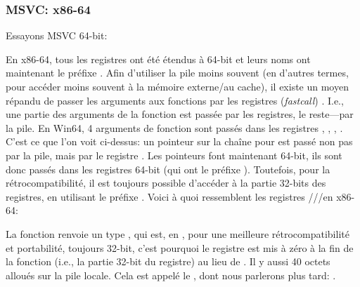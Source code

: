 \subsubsection{MSVC: x86-64}

Essayons MSVC 64-bit:




En x86-64, tous les registres ont été étendus à 64-bit et leurs noms ont maintenant le préfixe .
Afin d'utiliser la pile moins souvent (en d'autres termes, pour accéder moins souvent à la mémoire externe/au cache),
il existe un moyen répandu de passer les arguments aux fonctions par les registres (\emph{fastcall}) .
I.e., une partie des arguments de la fonction est passée par les registres, le reste---par la pile.
En Win64, 4 arguments de fonction sont passés dans les registres \RCX, \RDX, , .
C'est ce que l'on voit ci-dessus: un pointeur sur la chaîne pour \printf est passé non pas par la pile,
mais par le registre \RCX.
Les pointeurs font maintenant 64-bit, ils sont donc passés dans les registres 64-bit (qui ont le préfixe ).
Toutefois, pour la rétrocompatibilité, il est toujours possible d'accéder à la partie 32-bits des registres,
en utilisant le préfixe .
Voici à quoi ressemblent les registres \RAX/\EAX/\AX/\AL en x86-64:


La fonction \main renvoie un type \Tint{}, qui est, en \CCpp, pour une meilleure rétrocompatibilité
et portabilité, toujours 32-bit, c'est pourquoi le registre \EAX est mis à zéro à la fin de la fonction (i.e., la
partie 32-bit du registre) au lieu de \RAX{}.
Il y aussi 40 octets alloués sur la pile locale.
Cela est appelé le , dont nous parlerons plus tard: .
